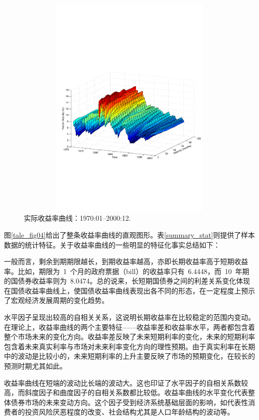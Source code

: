     \begin{figure}%
    \includegraphics[width=15.5cm,height=11cm]{figures/tale_fig04}
   \caption{实际收益率曲线：1970:01--2000:12.}
   \label{tale_fig04}
  \end{figure}

图\eqref{tale_fig04}给出了整条收益率曲线的直观图形。表\eqref{summary_stat}则提供了样本数据的统计特征。关于收益率曲线的一些明显的特征化事实总结如下：
\begin{compactenum}[(i)]
  \item 一般而言，剩余到期期限越长，到期收益率越高，亦即长期收益率高于短期收益率。比如，期限为~1~个月的政府票据（bill）的收益率只有~6.4448，而~10~年期的国债券收益率则为~8.0474。总的说来，长短期国债券之间的利差关系变化体现在国债收益率曲线上，使国债收益率曲线表现出各不同的形态，在一定程度上预示了宏观经济发展周期的变化趋势。
  \item 水平因子呈现出较高的自相关关系，这说明长期收益率在比较稳定的范围内变动。在理论上，收益率曲线的两个主要特征——收益率差和收益率水平，两者都包含着整个市场未来的变化方向。收益率差反映了未来短期利率的变化，未来的短期利率包含着未来真实利率与市场对未来利率变化方向的理性预期。由于真实利率在长期中的波动是比较小的，未来短期利率的上升主要反映了市场的预期变化，在较长的预测时期尤其如此。
  \item 收益率曲线在短端的波动比长端的波动大。这也印证了水平因子的自相关系数较高，而斜度因子和曲度因子的自相关系数都比较低。收益率曲线的水平变化代表整体债券市场的未来变动方向。这个因子受到经济系统基础层面的影响，如代表性消费者的投资风险厌恶程度的改变、社会结构尤其是人口年龄结构的波动等。
\end{compactenum}

